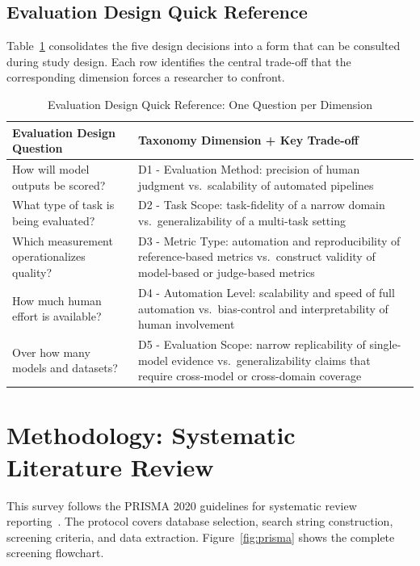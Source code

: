 \documentclass[journal]{IEEEtran}
\begin{document}
\subsection{Evaluation Design Quick Reference}
\label{subsec:quickref}

Table~\ref{tab:quickref} consolidates the five design decisions into a
form that can be consulted during study design. Each row identifies the
central trade-off that the corresponding dimension forces a researcher to
confront.

\begin{table}[!t]
\renewcommand{\arraystretch}{1.3}
\caption{Evaluation Design Quick Reference: One Question per Dimension}
\label{tab:quickref}
\centering
\begin{tabular}{p{} p{}}
\hline
\textbf{Evaluation Design Question} & \textbf{Taxonomy Dimension + Key Trade-off} \\
\hline
How will model outputs be scored? &
  D1 - Evaluation Method: precision of human judgment vs.\ scalability
  of automated pipelines \\
What type of task is being evaluated? &
  D2 - Task Scope: task-fidelity of a narrow domain vs.\ generalizability
  of a multi-task setting \\
Which measurement operationalizes quality? &
  D3 - Metric Type: automation and reproducibility of reference-based
  metrics vs.\ construct validity of model-based or judge-based metrics \\
How much human effort is available? &
  D4 - Automation Level: scalability and speed of full automation vs.\
  bias-control and interpretability of human involvement \\
Over how many models and datasets? &
  D5 - Evaluation Scope: narrow replicability of single-model evidence
  vs.\ generalizability claims that require cross-model or cross-domain
  coverage \\
\hline
\end{tabular}
\end{table}

\section{Methodology: Systematic Literature Review}
\label{sec:methodology}
\label{sec:methodology2}

This survey follows the PRISMA 2020 guidelines for systematic
review reporting~\cite{page2021prisma}. The protocol covers
database selection, search string construction, screening criteria,
and data extraction. Figure~\ref{fig:prisma} shows the complete
screening flowchart.
\end{document}
